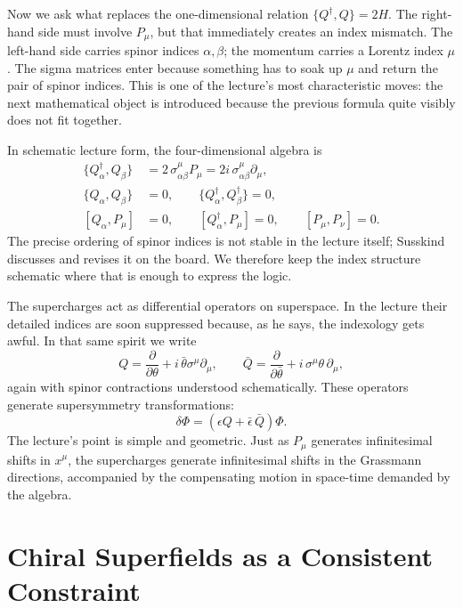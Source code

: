 Now we ask what replaces the one-dimensional relation \(\{Q^\dagger,Q\}=2H\). The right-hand side must involve \(P_\mu\), but that immediately creates an index mismatch. The left-hand side carries spinor indices \(\alpha,\beta\); the momentum carries a Lorentz index \(\mu\). The sigma matrices enter because something has to soak up \(\mu\) and return the pair of spinor indices. This is one of the lecture's most characteristic moves: the next mathematical object is introduced because the previous formula quite visibly does not fit together.

In schematic lecture form, the four-dimensional algebra is
\begin{align}
\{Q_\alpha^\dagger,Q_\beta\}
&=
2\,\sigma^\mu_{\alpha\beta}P_\mu
=
2i\,\sigma^\mu_{\alpha\beta}\partial_\mu,\\
\{Q_\alpha,Q_\beta\}&=0,
\qquad
\{Q_\alpha^\dagger,Q_\beta^\dagger\}=0,\\
[Q_\alpha,P_\mu]&=0,
\qquad
[Q_\alpha^\dagger,P_\mu]=0,
\qquad
[P_\mu,P_\nu]=0.
\end{align}
The precise ordering of spinor indices is not stable in the lecture itself; Susskind discusses and revises it on the board. We therefore keep the index structure schematic where that is enough to express the logic.

The supercharges act as differential operators on superspace. In the lecture their detailed indices are soon suppressed because, as he says, the indexology gets awful. In that same spirit we write
\begin{equation}
Q=\frac{\partial}{\partial\theta}+i\,\bar\theta\sigma^\mu\partial_\mu,
\qquad
\bar Q=\frac{\partial}{\partial\bar\theta}+i\,\sigma^\mu\theta\,\partial_\mu,
\end{equation}
again with spinor contractions understood schematically. These operators generate supersymmetry transformations:
\begin{equation}
\delta\Phi=(\epsilon Q+\bar\epsilon\,\bar Q)\Phi .
\end{equation}
The lecture's point is simple and geometric. Just as \(P_\mu\) generates infinitesimal shifts in \(x^\mu\), the supercharges generate infinitesimal shifts in the Grassmann directions, accompanied by the compensating motion in space-time demanded by the algebra.

\section{Chiral Superfields as a Consistent Constraint}

